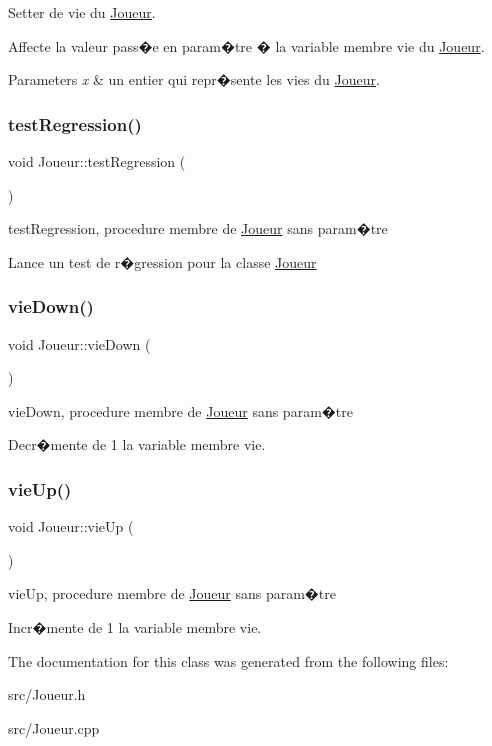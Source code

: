 Setter de vie du \hyperlink{classJoueur}{Joueur}. 

Affecte la valeur pass�e en param�tre � la variable membre vie du \hyperlink{classJoueur}{Joueur}. 
\begin{DoxyParams}{Parameters}
{\em x} & un entier qui repr�sente les vies du \hyperlink{classJoueur}{Joueur}. \\
\hline
\end{DoxyParams}
\mbox{\label{classJoueur_a26d38e39feb2ce8534139e7c7ac611cd}} 
\subsubsection{\texorpdfstring{test\+Regression()}{testRegression()}}
{\footnotesize\ttfamily void Joueur\+::test\+Regression (\begin{DoxyParamCaption}{ }\end{DoxyParamCaption})}



test\+Regression, procedure membre de \hyperlink{classJoueur}{Joueur} sans param�tre 

Lance un test de r�gression pour la classe \hyperlink{classJoueur}{Joueur} \mbox{\label{classJoueur_afb0f71527a83c9de2da0d3ec0a6d2eb5}} 
\subsubsection{\texorpdfstring{vie\+Down()}{vieDown()}}
{\footnotesize\ttfamily void Joueur\+::vie\+Down (\begin{DoxyParamCaption}{ }\end{DoxyParamCaption})}



vie\+Down, procedure membre de \hyperlink{classJoueur}{Joueur} sans param�tre 

Decr�mente de 1 la variable membre vie. \mbox{\label{classJoueur_a69f466f718df5ab72ade6fec1dab404a}} 
\subsubsection{\texorpdfstring{vie\+Up()}{vieUp()}}
{\footnotesize\ttfamily void Joueur\+::vie\+Up (\begin{DoxyParamCaption}{ }\end{DoxyParamCaption})}



vie\+Up, procedure membre de \hyperlink{classJoueur}{Joueur} sans param�tre 

Incr�mente de 1 la variable membre vie. 

The documentation for this class was generated from the following files\+:\begin{DoxyCompactItemize}
\item 
src/Joueur.\+h\item 
src/Joueur.\+cpp\end{DoxyCompactItemize}

